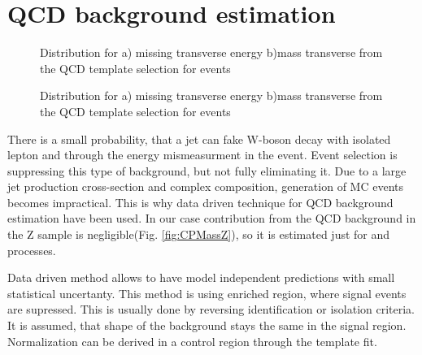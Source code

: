 \section{QCD background estimation}\label{sec:QCD}


\begin{figure}[!tbp]
\begin{minipage}[h]{0.49\linewidth}
\end{minipage}
\hfill
\begin{minipage}[h]{0.49\linewidth}
\end{minipage}
\caption{Distribution for a) missing transverse energy \etmiss b)mass transverse \mtw from the QCD template selection for \wenu events}
\label{ris:TemplateE}

\vfill

\begin{minipage}[h]{0.49\linewidth}
\end{minipage}
\hfill
\begin{minipage}[h]{0.49\linewidth}
\end{minipage}
\caption{Distribution for a) missing transverse energy \etmiss b)mass transverse \mtw from the QCD template selection for \wmunu events}
\label{ris:TemplateMu}
\end{figure}

There is a small probability, that a jet can fake W-boson decay with isolated lepton and \etmiss through the energy mismeasurment in the event.  Event selection is suppressing this type of background, but not fully eliminating it. Due to a large jet production cross-section and complex composition, generation of MC events becomes impractical. This is why data driven technique for QCD background estimation have been used. In our case contribution from the QCD background  in the Z sample is negligible(Fig. \ref{fig:CPMassZ}), so it is estimated just for \wenu and \wmunu processes. 

Data driven method allows to have model independent predictions with small statistical uncertanty. This method is using \qcd enriched region, where signal events are supressed. This is usually done by reversing identification or isolation criteria. It is assumed, that shape of the \qcd background stays the same in the signal region. Normalization can  be derived in a control region through the template fit. 

